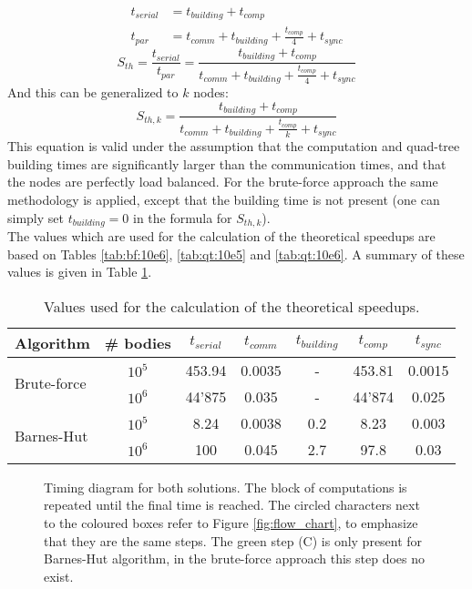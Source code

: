 \begin{align}
t_{serial}& = t_{building} + t_{comp}\\
t_{par} &= t_{comm} + t_{building } + \frac{t_{comp}}{4} + t_{sync}
\end{align}
\[S_{th} = \frac{t_{serial}}{t_{par}} = \frac{t_{building} + t_{comp}}{t_{comm} + t_{building } + \frac{t_{comp}}{4} + t_{sync}}\]
And this can be generalized to $k$ nodes: 
\[S_{th,k} = \frac{t_{building} + t_{comp}}{ t_{comm} + t_{building} + \frac{t_{comp}}{k} + t_{sync}}\]
This equation is valid under the assumption that the computation and quad-tree building times are significantly larger than the communication times, and that the nodes are perfectly load balanced. For the brute-force approach the same methodology is applied, except that the building time is not present (one can simply set $t_{building}=0$ in the formula for $S_{th,k}$).\\
The values which are used for the calculation of the theoretical speedups are based on Tables \ref{tab:bf:10e6}, \ref{tab:qt:10e5} and \ref{tab:qt:10e6}. A summary of these values is given in Table \ref{tab:summary:th_su}.
\begin{table}[H]
\centering
\begin{tabular}{l|cccccc}
Algorithm                    & \# bodies & $t_{serial}$ & $t_{comm}$ & $t_{building}$ & $t_{comp}$ & $t_{sync}$ \\
\hline\multirow{2}{*}{Brute-force} & $10^5$    & 453.94  & 0.0035 & -  & 453.81 & 0.0015\\
                             & $10^6$    & 44'875&  0.035 & -  & 44'874 & 0.025\\     
\multirow{2}{*}{Barnes-Hut}  & $10^5$    & 8.24 & 0.0038 & 0.2 & 8.23 & 0.003\\
                             & $10^6$    & 100 & 0.045 & 2.7 & 97.8 & 0.03\\
\end{tabular}
\caption{Values used for the calculation of the theoretical speedups.}
\label{tab:summary:th_su}
\end{table}

\begin{figure}[H]
\centering
{}
\caption{Timing diagram for both solutions. The block of computations is repeated until the final time is reached. The circled characters next to the coloured boxes refer to Figure \ref{fig:flow_chart}, to emphasize that they are the same steps. The green step (C) is only present for Barnes-Hut algorithm, in the brute-force approach this step does no exist.}
\label{fig:timing}
\end{figure}

